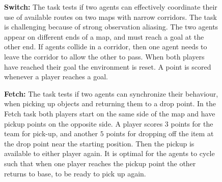 \documentclass{article}
\begin{document}
\begin{figure}




{\bf Switch:} The task tests if two agents can effectively coordinate their use of available routes on two maps with narrow corridors. The task is challenging because of strong observation aliasing. The two agents appear on different ends of a map, and must reach a goal at the other end. If agents collide in a corridor, then one agent needs to leave the corridor to allow the other to pass. When both players have reached their goal the environment is reset. A point is scored whenever a player reaches a goal. 

{\bf Fetch:} The task tests if two agents can synchronize their behaviour, when picking up objects and returning them to a drop point. In the Fetch task both players start on the same side of the map and have pickup points on the opposite side. A player scores $3$ points for the team for pick-up, and another $5$ points for dropping off the item at the drop point near the starting position. Then the pickup is available to either player again. It is optimal for the agents to cycle such that when one player reaches the pickup point the other returns to base, to be ready to pick up again. 


\end{figure}
\end{document}
